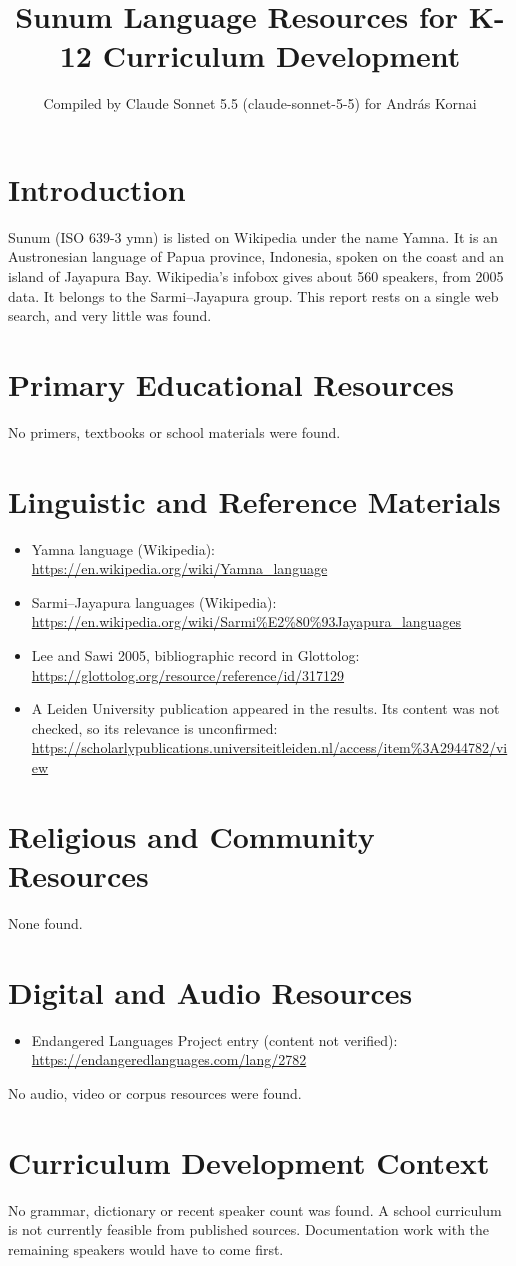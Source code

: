 \documentclass[12pt]{article}
\title{Sunum Language Resources for K-12 Curriculum Development}
\author{Compiled by Claude Sonnet 5.5 (claude-sonnet-5-5) for Andr\'as Kornai}
\date{}
\begin{document}
\maketitle

\section{Introduction}
Sunum (ISO 639-3 ymn) is listed on Wikipedia under the name Yamna. It is an Austronesian language of Papua province, Indonesia, spoken on the coast and an island of Jayapura Bay. Wikipedia's infobox gives about 560 speakers, from 2005 data. It belongs to the Sarmi--Jayapura group. This report rests on a single web search, and very little was found.

\section{Primary Educational Resources}
No primers, textbooks or school materials were found.

\section{Linguistic and Reference Materials}
\begin{itemize}
\item Yamna language (Wikipedia): \url{https://en.wikipedia.org/wiki/Yamna_language}
\item Sarmi--Jayapura languages (Wikipedia): \url{https://en.wikipedia.org/wiki/Sarmi%E2%80%93Jayapura_languages}
\item Lee and Sawi 2005, bibliographic record in Glottolog: \url{https://glottolog.org/resource/reference/id/317129}
\item A Leiden University publication appeared in the results. Its content was not checked, so its relevance is unconfirmed: \url{https://scholarlypublications.universiteitleiden.nl/access/item%3A2944782/view}
\end{itemize}

\section{Religious and Community Resources}
None found.

\section{Digital and Audio Resources}
\begin{itemize}
\item Endangered Languages Project entry (content not verified): \url{https://endangeredlanguages.com/lang/2782}
\end{itemize}
No audio, video or corpus resources were found.

\section{Curriculum Development Context}
No grammar, dictionary or recent speaker count was found. A school curriculum is not currently feasible from published sources. Documentation work with the remaining speakers would have to come first.
\end{document}
